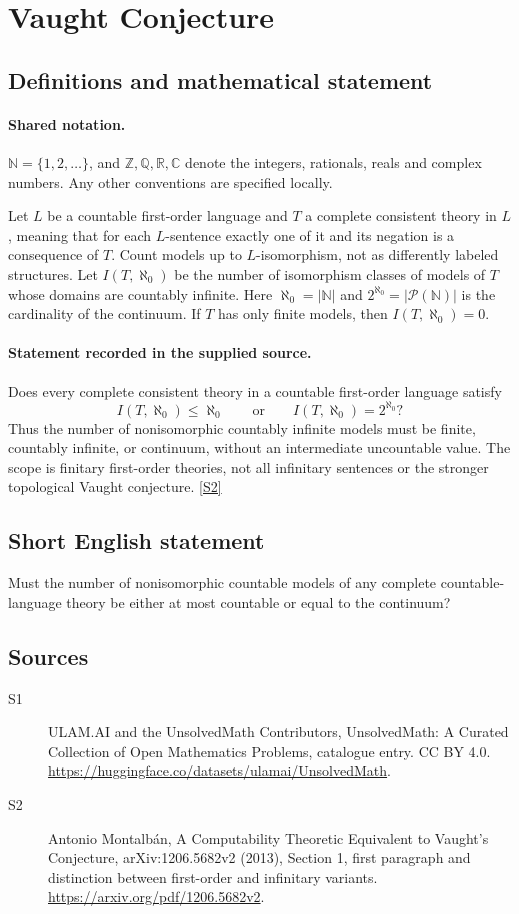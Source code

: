 \documentclass[11pt]{article}
\newcommand{\sref}[2]{\hyperlink{source:#1:#2}{[S#2]}}
\begin{document}
\section{Vaught Conjecture}\label{statement}

\subsection{Definitions and mathematical statement}

\paragraph{Shared notation.}$\mathbb N=\{1,2,\ldots\}$, and $\mathbb Z,\mathbb Q,\mathbb R,\mathbb C$ denote the integers, rationals, reals and complex numbers. Any other conventions are specified locally.


Let $L$ be a countable first-order language and $T$ a complete consistent theory in $L$, meaning that for each $L$-sentence exactly one of it and its negation is a consequence of $T$. Count models up to $L$-isomorphism, not as differently labeled structures. Let $I(T,\aleph_0)$ be the number of isomorphism classes of models of $T$ whose domains are countably infinite. Here $\aleph_0=|\mathbb N|$ and $2^{\aleph_0}=|\mathcal P(\mathbb N)|$ is the cardinality of the continuum. If $T$ has only finite models, then $I(T,\aleph_0)=0$.
\paragraph{Statement recorded in the supplied source.}
Does every complete consistent theory in a countable first-order language satisfy
\[
 I(T,\aleph_0)\le\aleph_0\qquad\text{or}\qquad I(T,\aleph_0)=2^{\aleph_0}?
\]
Thus the number of nonisomorphic countably infinite models must be finite, countably infinite, or continuum, without an intermediate uncountable value. The scope is finitary first-order theories, not all infinitary sentences or the stronger topological Vaught conjecture. \sref{statement}{2}
\subsection{Short English statement}
Must the number of nonisomorphic countable models of any complete countable-language theory be either at most countable or equal to the continuum?
\subsection{Sources}
\begin{description}
\item[\hypertarget{source:statement:1}{S1}] ULAM.AI and the UnsolvedMath Contributors, UnsolvedMath: A Curated Collection of Open Mathematics Problems, catalogue entry. CC BY 4.0. \url{https://huggingface.co/datasets/ulamai/UnsolvedMath}.
\item[\hypertarget{source:statement:2}{S2}] Antonio Montalbán, A Computability Theoretic Equivalent to Vaught’s Conjecture, arXiv:1206.5682v2 (2013), Section 1, first paragraph and distinction between first-order and infinitary variants. \url{https://arxiv.org/pdf/1206.5682v2}.
\end{description}
\label{end:statement}
\end{document}
